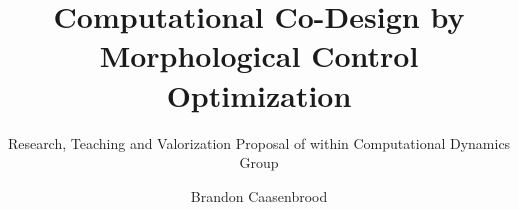 \documentclass[acmtog]{acmart}
\begin{document}
\title{Computational Co-Design by Morphological Control Optimization}
\subtitle{Research, Teaching and Valorization Proposal of within Computational Dynamics Group}

\author{Brandon Caasenbrood}
\authornotemark[1]

\renewcommand{\shortauthors}{Caasenbrood et al.}

\begin{abstract}

\end{abstract}




\maketitle





{\small

}
\end{document}
